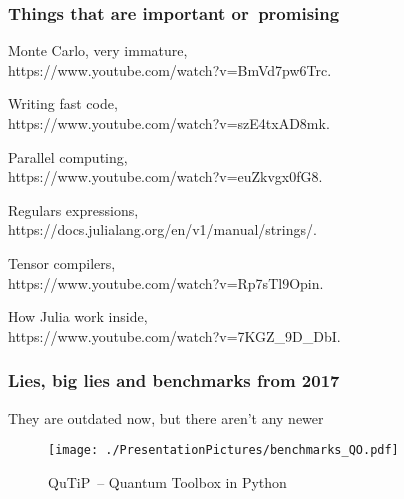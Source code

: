 \documentclass[10pt,t]{beamer}
\begin{document}
\begin{frame}
  \frametitle{Things that are important or~promising}


  Monte Carlo, very immature, \\
  {https://www.youtube.com/watch?v=BmVd7pw6Trc}.

  \vspace{0.3em}



  Writing fast code, \\
  {https://www.youtube.com/watch?v=szE4txAD8mk}.

  \vspace{0.3em}



  Parallel computing, \\
  {https://www.youtube.com/watch?v=euZkvgx0fG8}.

  \vspace{0.3em}



  Regulars expressions, \\
  {https://docs.julialang.org/en/v1/manual/strings/}.

  \vspace{0.3em}



  Tensor compilers, \\
  {https://www.youtube.com/watch?v=Rp7sTl9Opin}.

  \vspace{0.3em}



  How Julia work inside, \\
  {https://www.youtube.com/watch?v=7KGZ\_9D\_DbI}.

\end{frame}





\begin{frame}
  \frametitle{Lies, big lies and benchmarks from 2017}


  {They are outdated now, but there aren't any newer}


  \begin{figure}

    \centering

    \texttt{[image: ./PresentationPictures/benchmarks\_QO.pdf]}

    \caption{QuTiP~-- Quantum Toolbox in Python}

  \end{figure}

\end{frame}
\end{document}
